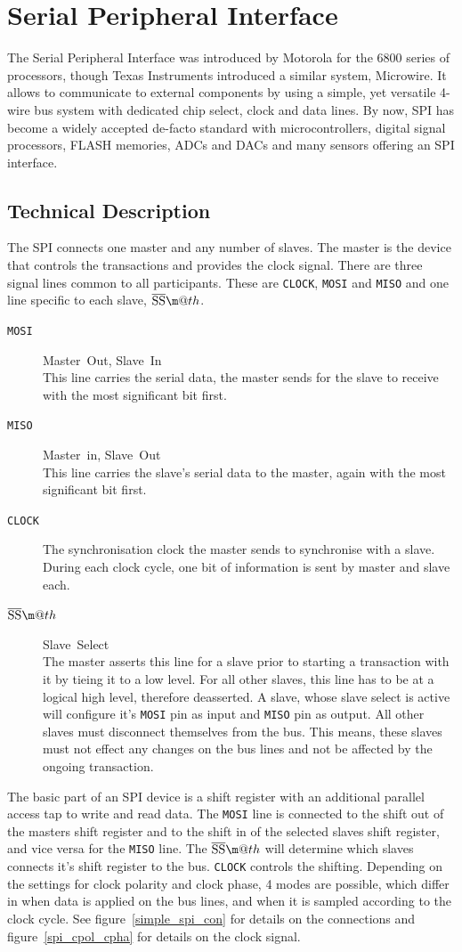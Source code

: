 \documentclass[journal]{IEEEtran}
\makeatletter
\newcommand{\mosi}{\texttt{MOSI}\xspace}
\newcommand{\miso}{\texttt{MISO}\xspace}
\newcommand{\clock}{\texttt{CLOCK}\xspace}
\renewcommand{\ss}{\texttt{\textoverline{SS}}\xspace}
\newcommand*{\textoverline}[1]{$\overline{\hbox{#1}}\m@th$}
\makeatother
\begin{document}
\section{Serial Peripheral Interface}
The Serial Peripheral Interface was introduced by Motorola for the 6800 series of processors, though Texas Instruments introduced a similar system, Microwire\cite{microwire}. It allows to communicate to external components by using a simple, yet versatile 4-wire bus system with dedicated chip select, clock and data lines. By now, SPI has become a widely accepted de-facto standard with microcontrollers, digital signal processors, FLASH memories, ADCs and DACs and many sensors offering an SPI interface.

\subsection{Technical Description}
The SPI connects one master and any number of slaves. The master is the device that controls the transactions and provides the clock signal. There are three signal lines common to all participants. These are \clock, \mosi and \miso and one line specific to each slave, \ss.
\begin{description}
	\item[\mosi] Master~Out, Slave~In\\This line carries the serial data, the master sends for the slave to receive with the most significant bit first.
	\item[\miso] Master~in, Slave~Out\\ This line carries the slave's serial data to the master, again with the most significant bit first.
	\item[\clock] The synchronisation clock the master sends to synchronise with a slave. During each clock cycle, one bit of information is sent by master and slave each.
	\item[\ss] Slave~Select\\ The master asserts this line for a slave prior to starting a transaction with it by tieing it to a low level. For all other slaves, this line has to be at a logical high level, therefore deasserted. A slave, whose slave select is active will configure it's \mosi pin as input and \miso pin as output. All other slaves must disconnect themselves from the bus. This means, these slaves must not effect any changes on the bus lines and not be affected by the ongoing transaction.
\end{description}
The basic part of an SPI device is a shift register with an additional parallel access tap to write and read data. The \mosi line is connected to the shift out of the masters shift register and to the shift in of the selected slaves shift register, and vice versa for the \miso line. The \ss will determine which slaves connects it's shift register to the bus. \clock controls the shifting. Depending on the settings for clock polarity and clock phase, 4 modes are possible, which differ in when data is applied on the bus lines, and when it is sampled according to the clock cycle.  See figure~\ref{simple_spi_con} for details on the connections and figure~\ref{spi_cpol_cpha} for details on the clock signal.
\end{document}
